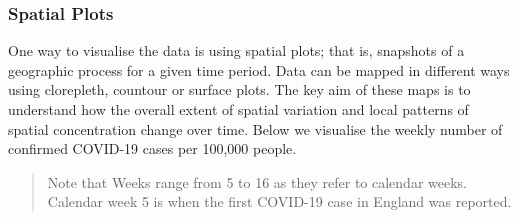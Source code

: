 \documentclass[
  letterpaper,
  krantz2]{style/krantz}
\newenvironment{Shaded}{\begin{snugshade}}{\end{snugshade}}
\newcommand{\CommentTok}[1]{\textcolor[rgb]{0.37,0.37,0.37}{#1}}
\newcommand{\DecValTok}[1]{\textcolor[rgb]{0.68,0.00,0.00}{#1}}
\newcommand{\FunctionTok}[1]{\textcolor[rgb]{0.28,0.35,0.67}{#1}}
\newcommand{\NormalTok}[1]{\textcolor[rgb]{0.00,0.23,0.31}{#1}}
\newcommand{\OtherTok}[1]{\textcolor[rgb]{0.00,0.23,0.31}{#1}}
\newcommand{\SpecialCharTok}[1]{\textcolor[rgb]{0.37,0.37,0.37}{#1}}
\begin{document}
\begin{Shaded}
\end{Shaded}

\hypertarget{spatial-plots}{%
\subsubsection{Spatial Plots}\label{spatial-plots}}

One way to visualise the data is using spatial plots; that is, snapshots
of a geographic process for a given time period. Data can be mapped in
different ways using clorepleth, countour or surface plots. The key aim
of these maps is to understand how the overall extent of spatial
variation and local patterns of spatial concentration change over time.
Below we visualise the weekly number of confirmed COVID-19 cases per
100,000 people.

\begin{quote}
Note that Weeks range from 5 to 16 as they refer to calendar weeks.
Calendar week 5 is when the first COVID-19 case in England was reported.
\end{quote}
\end{document}
